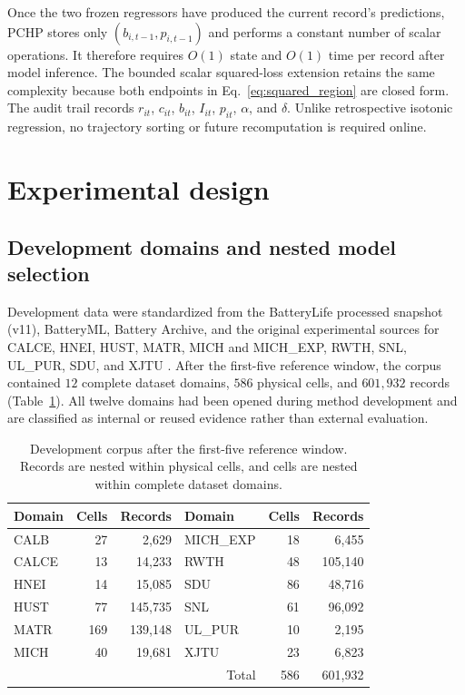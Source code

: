 \documentclass[11pt]{article}
\begin{document}
Once the two frozen regressors have produced the current record's predictions, PCHP stores only $(b_{i,t-1},p_{i,t-1})$ and performs a constant number of scalar operations. It therefore requires $O(1)$ state and $O(1)$ time per record after model inference. The bounded scalar squared-loss extension retains the same complexity because both endpoints in Eq.~\eqref{eq:squared_region} are closed form. The audit trail records $r_{it}$, $c_{it}$, $b_{it}$, $I_{it}$, $p_{it}$, $\alpha$, and $\delta$. Unlike retrospective isotonic regression, no trajectory sorting or future recomputation is required online.

\section{Experimental design}

\subsection{Development domains and nested model selection}

Development data were standardized from the BatteryLife processed snapshot (v11), BatteryML, Battery Archive, and the original experimental sources for CALCE, HNEI, HUST, MATR, MICH and MICH\_EXP, RWTH, SNL, UL\_PUR, SDU, and XJTU \citep{zhang2024batteryml,tan2025batterylife,batterylife2026processed,batteryarchive,xing2013ensemble,devie2018variability,ma2022personalized,severson2019cyclelife,attia2020closedloop,weng2021formation,li2021oneshot,preger2020degradation,juarezrobles2020safety,wang2025sorting,wang2024pinn}. After the first-five reference window, the corpus contained $12$ complete dataset domains, $586$ physical cells, and $601{,}932$ records (Table~\ref{tab:data}). All twelve domains had been opened during method development and are classified as internal or reused evidence rather than external evaluation.

\begin{table}[t]
\centering
\caption{Development corpus after the first-five reference window. Records are nested within physical cells, and cells are nested within complete dataset domains.}
\label{tab:data}
\begin{tabular}{lrr@{\qquad}lrr}
\toprule
Domain & Cells & Records & Domain & Cells & Records \\
\midrule
CALB & 27 & 2,629 & MICH\_EXP & 18 & 6,455 \\
CALCE & 13 & 14,233 & RWTH & 48 & 105,140 \\
HNEI & 14 & 15,085 & SDU & 86 & 48,716 \\
HUST & 77 & 145,735 & SNL & 61 & 96,092 \\
MATR & 169 & 139,148 & UL\_PUR & 10 & 2,195 \\
MICH & 40 & 19,681 & XJTU & 23 & 6,823 \\
\midrule
\multicolumn{4}{r}{Total} & 586 & 601,932 \\
\bottomrule
\end{tabular}
\end{table}
\end{document}
